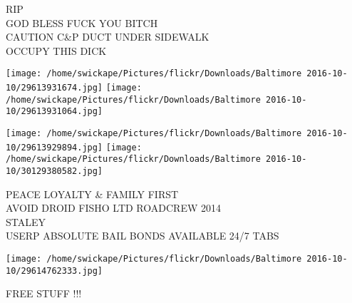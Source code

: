 \documentclass[10pt,letterpaper]{article}
\begin{document}
RIP\\
GOD BLESS FUCK YOU BITCH\\
CAUTION C\&P DUCT UNDER SIDEWALK\\
OCCUPY THIS DICK\\
\pagebreak

\texttt{[image: /home/swickape/Pictures/flickr/Downloads/Baltimore 2016-10-10/29613931674.jpg]}
\texttt{[image: /home/swickape/Pictures/flickr/Downloads/Baltimore 2016-10-10/29613931064.jpg]}

\texttt{[image: /home/swickape/Pictures/flickr/Downloads/Baltimore 2016-10-10/29613929894.jpg]}
\texttt{[image: /home/swickape/Pictures/flickr/Downloads/Baltimore 2016-10-10/30129380582.jpg]}

PEACE LOYALTY \& FAMILY FIRST\\
AVOID DROID FISHO LTD ROADCREW 2014\\
STALEY\\
USERP ABSOLUTE BAIL BONDS AVAILABLE 24/7 TABS\\
\pagebreak

\texttt{[image: /home/swickape/Pictures/flickr/Downloads/Baltimore 2016-10-10/29614762333.jpg]}

FREE STUFF !!!\\
\pagebreak
\end{document}
